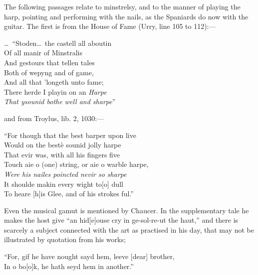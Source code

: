The following passages relate to minstrelsy, and to the manner of playing the
harp, pointing and performing with the nails, as the Spaniards do now with the
guitar. The first is from the House of Fame (Urry, line 105 to 112):—
\settowidth{\versewidth}{\ldots\  “Stoden\ldots\  the castell all aboutin}
\begin{scverse}
\ldots\  “Stoden\ldots\  the castell all aboutin\\
Of all manir of Minstralis\\
And gestours that tellen tales\\
Both of wepyng and of game,\\
And all that ’longeth unto fame;\\
There herde I playin on an \textit{Harpe}\\
\textit{That ysounid bothe well and sharpe}”
\end{scverse}
and from Troylus, lib. 2, 1030:—
\settowidth{\versewidth}{Touch aie o (one) string, or aie o warble harpe,}
\begin{scverse}
“For though that the best barper upon live\\
Would on the bestè sounid jolly harpe\\
That evir was, with all his fingers five\\
Touch aie o (one) string, or aie o warble harpe,\\
\textit{Were his nailes poincted nevir so sharpe}\\
It shoulde makin every wight to[o] dull\\
To heare [h]is Glee, and of his strokes ful.”
\end{scverse}

Even the musical gamut is mentioned by Chaucer. In the supplementary tale
he makes the host give “an hid[e]ouse cry in ge-sol-re-ut the haut,” and there is
scarcely a subject connected with the art as practised in his day, that may not be
illustrated by quotation from his works;
\begin{scverse}
“For, gif he have nought sayd hem, leeve [dear] brother,\\
In o bo[o]k, he hath seyd hem in another.” 
\end{scverse}


\pagebreak